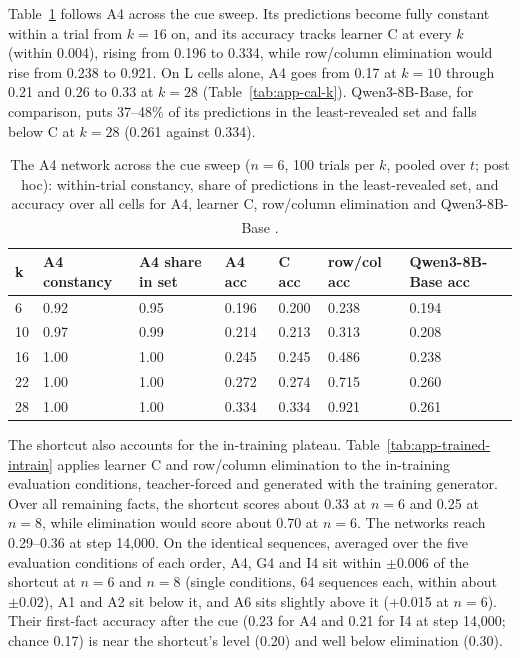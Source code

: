 \documentclass[11pt]{article}
\begin{document}
Table~\ref{tab:app-trained-sweep} follows A4 across the cue sweep. Its predictions become fully constant within a trial from $k = 16$ on, and its accuracy tracks learner C at every $k$ (within 0.004), rising from 0.196 to 0.334, while row/column elimination would rise from 0.238 to 0.921. On L cells alone, A4 goes from 0.17 at $k = 10$ through 0.21 and 0.26 to 0.33 at $k = 28$ (Table~\ref{tab:app-cal-k}). Qwen3-8B-Base, for comparison, puts 37--48\% of its predictions in the least-revealed set and falls below C at $k = 28$ (0.261 against 0.334).

\begin{table}[tbp]
\centering
\small
\caption{The A4 network across the cue sweep ($n = 6$, 100 trials per $k$, pooled over $t$; post hoc): within-trial constancy, share of predictions in the least-revealed set, and accuracy over all cells for A4, learner C, row/column elimination and Qwen3-8B-Base \textsuperscript{\dag}.}\label{tab:app-trained-sweep}
\begin{tabular}{@{}lllllll@{}}
\toprule
k & A4 constancy & A4 share in set & A4 acc & C acc & row/col acc & Qwen3-8B-Base acc \\
\midrule
6 & 0.92 & 0.95 & 0.196 & 0.200 & 0.238 & 0.194 \\
10 & 0.97 & 0.99 & 0.214 & 0.213 & 0.313 & 0.208 \\
16 & 1.00 & 1.00 & 0.245 & 0.245 & 0.486 & 0.238 \\
22 & 1.00 & 1.00 & 0.272 & 0.274 & 0.715 & 0.260 \\
28 & 1.00 & 1.00 & 0.334 & 0.334 & 0.921 & 0.261 \\
\bottomrule
\end{tabular}
\end{table}

The shortcut also accounts for the in-training plateau. Table~\ref{tab:app-trained-intrain} applies learner C and row/column elimination to the in-training evaluation conditions, teacher-forced and generated with the training generator. Over all remaining facts, the shortcut scores about 0.33 at $n = 6$ and 0.25 at $n = 8$, while elimination would score about 0.70 at $n = 6$. The networks reach 0.29--0.36 at step 14,000. On the identical sequences, averaged over the five evaluation conditions of each order, A4, G4 and I4 sit within $\pm 0.006$ of the shortcut at $n = 6$ and $n = 8$ (single conditions, 64 sequences each, within about $\pm 0.02$), A1 and A2 sit below it, and A6 sits slightly above it (+0.015 at $n = 6$). Their first-fact accuracy after the cue (0.23 for A4 and 0.21 for I4 at step 14,000; chance 0.17) is near the shortcut's level (0.20) and well below elimination (0.30).
\end{document}
